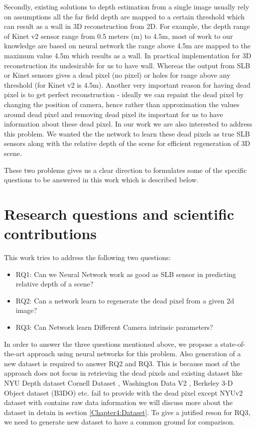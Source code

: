 Secondly, existing solutions to depth estimation from a single image usually rely on assumptions all the far field depth are mapped to a certain threshold which can result as a wall in 3D reconstruction from 2D. For example, the depth range of Kinet v2 sensor range from 0.5 meters (m) to 4.5m, most of work to our knowledge are based on neural network the range above 4.5m are mapped to the maximum value 4.5m \cite{Silberman:ECCV12} which results as a wall. In practical implementation for 3D reconstruction its undesirable for us to have wall. Whereas the output from SLB or Kinet sensors gives a dead pixel (no pixel) or holes for range above any threshold (for Kinet v2 is 4.5m). Another very important reason for having dead pixel is to get perfect reconstruction - ideally we can repaint the dead pixel by changing the position of camera, hence rather than approximation the values around dead pixel and removing dead pixel its important for us to have information about these dead pixel. In our work we are also interested to address this problem. We wanted the the network to learn these dead pixels as true SLB sensors along with the relative depth of the scene for efficient regeneration of 3D scene. 

These two problems gives us a clear direction to formulates some of the specific questions to be answered in this work which is described below. 


\section{Research questions and scientific contributions}

This work tries to address the following two questions:
\begin{itemize}
    \item RQ1: Can we Neural Network work as good as SLB sensor in predicting relative depth of a scene?
    \item RQ2: Can a network learn to regenerate the dead pixel from a given 2d image?
    \item RQ3: Can Network learn Different Camera intrinsic parameters?  
\end{itemize}

In order to answer the three questions mentioned above, we propose a state-of-the-art approach using neural networks for this problem. Also generation of a new dataset is required to answer RQ2 and RQ3. This is because most of the approach does not focus in retrieving the dead pixels and existing dataset like NYU Depth dataset \cite{silberman11indoor} Cornell Dataset \cite{3Dscene} , Washington Data V2 \cite{Washington}, Berkeley 3-D Object dataset (B3DO) \cite{Janoch:EECS-2012-85} etc. fail to provide with the dead pixel except NYUv2 dataset with contains raw data information we will discuss more about the dataset in detain in section \ref{Chapter4:Dataset}. To give a jutified reson for RQ3, we need to generate new dataset to have a common ground for comparison. 

